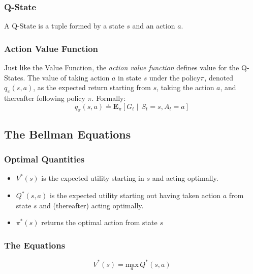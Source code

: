 \subsubsection{Q-State}
A Q-State is a tuple formed by a state $s$ and an action $a$.

\subsubsection{Action Value Function}
Just like the Value Function, the \textit{action value function} defines value for the Q-States. The value of taking action $a$ in state $s$ under the policy$\pi$, denoted $q_{\pi}\left(s,a\right)$, as the expected return starting from $s$, taking the action $a$, and thereafter following policy $\pi$. Formally:
\begin{equation} \label{ActionValueFunction}
q_{\pi}\left(s,a\right) \doteq \mathbf{E}_{\pi}\left[G_{t}\mid\,S_{t} = s,A_{t} = a\right]
\end{equation}




\subsection{The Bellman Equations}

\subsubsection{Optimal Quantities}

\begin{itemize}
	\item $V^*\left(s\right)$  is the expected utility starting in $s$ and acting optimally.
	\item $Q^*\left(s,a\right)$ is the expected utility starting out having taken action $a$ from state $s$ and (thereafter) acting optimally.
	\item $\pi^*\left(s\right)$ returns the optimal action from state $s$
\end{itemize}

\subsubsection{The Equations}

\begin{equation} \label{Bellman1}
V^*\left(s\right) = \underset{a}{\text{max}}\,Q^*\left(s,a\right)
\end{equation}

